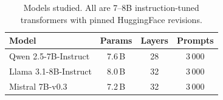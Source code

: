 \begin{table}[t]
  \caption{Models studied.  All are 7--8B instruction-tuned transformers
  with pinned HuggingFace revisions.}
  \label{tab:models}
  \vskip 0.1in
  \begin{center}
  \begin{small}
  \begin{tabular}{lccc}
    \toprule
    Model & Params & Layers & Prompts \\
    \midrule
    Qwen 2.5-7B-Instruct  & 7.6\,B & 28 & 3\,000 \\
    Llama 3.1-8B-Instruct  & 8.0\,B & 32 & 3\,000 \\
    Mistral 7B-v0.3 & 7.2\,B & 32 & 3\,000 \\
    \bottomrule
  \end{tabular}
  \end{small}
  \end{center}
\end{table}
